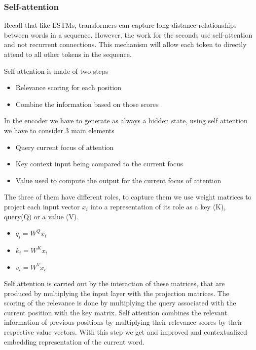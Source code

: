 \subsubsection{Self-attention}

Recall that like LSTMs, transformers can capture long-distance relationships between words in a sequence. However, the work for the seconds use self-attention and not recurrent connections. This mechanism will allow each token to directly attend to all other tokens in the sequence.

\vspace{10pt}

Self-attention is made of two steps

\begin{itemize}
    \item Relevance scoring for each position
    \item Combine the information based on those scores
\end{itemize}

In the encoder we have to generate as always a hidden state, using self attention we have to consider 3 main elements

\begin{itemize}
    \item Query \ra current focus of attention
    \item Key \ra context input being compared to the current focus
    \item Value \ra used to compute the output for the current focus of attention
\end{itemize}

The three of them have different roles, to capture them we use weight matrices to project each input vector $x_i$ into a representation of its role as a key (K), query(Q) or a value (V).

\begin{itemize}
    \item $q_i = W^Q x_i$
    \item $k_i= W^K x_i$
    \item $v_i = W^V x_i$
\end{itemize}

Self attention is carried out by the interaction of these matrices, that are produced by multiplying the input layer with the projection matrices. The scoring of the relevance is done by multiplying the query associated with the current position with the key matrix. Self attention combines the relevant information of previous positions by multiplying their relevance scores by their respective value vectors. With this step we get and improved and contextualized embedding representation of the current word.

